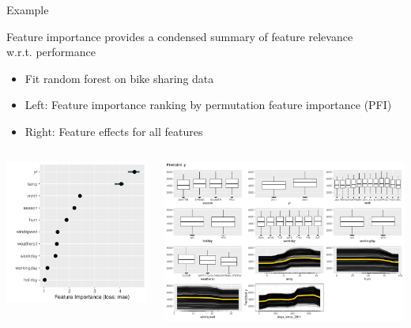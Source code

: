 \documentclass[10pt,compress,t,notes=noshow, xcolor=table]{beamer}
\begin{document}
\begin{frame}{Example}

Feature importance provides a condensed summary of feature relevance \\w.r.t. performance

\medskip

\begin{itemize}
    \item Fit random forest on bike sharing data
    \item Left: Feature importance ranking by permutation feature importance (PFI)
    \item Right: Feature effects for all features
\end{itemize}

\centering
\begin{columns}[c, totalwidth=\textwidth]
  \begin{column}{0.37\textwidth}
\includegraphics[width=.98\linewidth]{figure_man/bike_pfi}
\end{column}
  \begin{column}{0.63\textwidth}
  \includegraphics[width=\linewidth]{figure_man/bike_pdp+ice}

\end{column}
\end{columns}
\end{frame}
\end{document}
